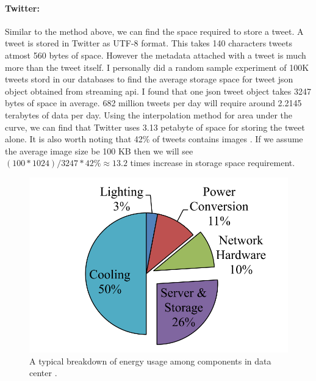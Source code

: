 \paragraph{Twitter:}
Similar to the method above, we can find the space required to store a tweet. A tweet is stored in Twitter as UTF-8 format. This takes 140 characters tweets atmost 560 bytes of space. However the metadata attached with a tweet is much more than the tweet itself. I personally did a random sample experiment of 100K tweets stord in our databases to find the average storage space for tweet json object obtained from streaming api. I found that one json tweet object takes 3247 bytes of space in average.
682 million tweets per day will require around 2.2145 terabytes of data per day. Using the interpolation method for area under the curve, we can find that Twitter uses 3.13 petabyte of space for storing the tweet alone. It is also worth noting that 42\% of tweets contains images \cite{tweets_images}. If we assume the average image size be 100 KB then we will see $(100 * 1024)/3247 * 42 \% \approx 13.2$ times increase in storage space requirement.

\begin{figure}[t]
	\includegraphics[width=0.7\linewidth ]{fig/energy_usage.png}
    \vspace{-2mm}
    \caption{A typical breakdown of energy usage among components in data center \cite{info2007top}.}
    \label{fig:energy_usage}
\end{figure}

